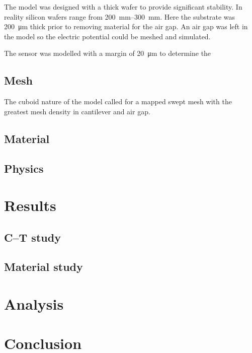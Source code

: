 \documentclass[a4paper,10pt,twocolumn]{article}
\begin{document}
The model was designed with a thick wafer to provide significant stability. In
reality silicon wafers range from \SIrange{200}{300}{\milli\meter}. Here the
substrate was \SI{200}{\micro\meter} thick prior to removing material for the
air gap. An air gap was left in the model so the electric potential could be meshed and simulated.

The sensor was modelled with a margin of \SI{20}{\micro\meter} to determine the 

\subsection{Mesh}

The cuboid nature of the model called for a mapped swept mesh with the greatest
mesh density in cantilever and air gap.

\subsection{Material}
\subsection{Physics}

\section{Results}

\subsection{C--T study}

\subsection{Material study}

\begin{figure}[h]
    \begin{footnotesize}
        
    \end{footnotesize}
    \caption{}
    \label{fig:material_study.C-T}
\end{figure}

\begin{figure}[h]
    \begin{footnotesize}
        
    \end{footnotesize}
    \caption{}
    \label{fig:material_study.C-T}
\end{figure}

\section{Analysis}
\section{Conclusion}

\end{document}
